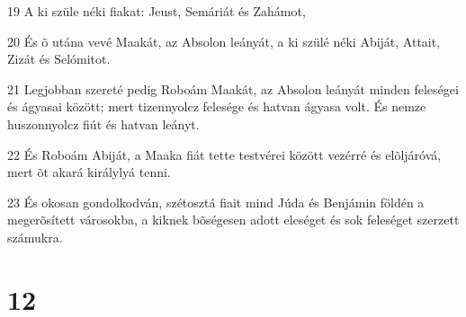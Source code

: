 \par 19 A ki szüle néki fiakat: Jeust, Semáriát és Zahámot,
\par 20 És õ utána vevé Maakát, az Absolon leányát, a ki szülé néki Abiját, Attait, Zizát és Selómitot.
\par 21 Legjobban szereté pedig Roboám Maakát, az Absolon leányát minden feleségei és ágyasai között; mert tizennyolcz felesége és hatvan ágyasa volt. És nemze huszonnyolcz fiút és hatvan leányt.
\par 22 És Roboám Abiját, a Maaka fiát tette testvérei között vezérré és elõljáróvá, mert õt akará királylyá tenni.
\par 23 És okosan gondolkodván, szétosztá fiait mind Júda és Benjámin földén a megerõsített városokba, a kiknek bõségesen adott eleséget és sok feleséget szerzett számukra.

\chapter{12}

